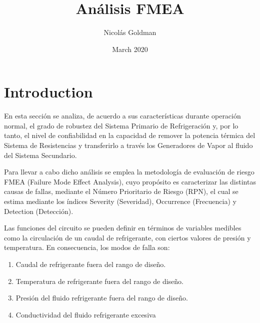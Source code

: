 \documentclass{article}
\title{Análisis FMEA}
\author{Nicolás Goldman}
\date{March 2020}
\begin{document}
\maketitle

\section{Introduction}
En esta sección se analiza, de acuerdo a sus características durante operación normal, el grado de robustez del Sistema Primario de Refrigeración y, por lo tanto, el nivel de   confiabilidad   en   la   capacidad   de  remover   la   potencia   térmica  del   Sistema   de Resistencias  y  transferirlo  a  través  los  Generadores  de  Vapor  al  fluido  del  Sistema Secundario.

Para llevar a cabo dicho análisis se emplea la metodología de evaluación de riesgo FMEA (Failure Mode Effect Analysis), cuyo propósito es caracterizar las distintas causas de fallas,  mediante  el  Número  Prioritario  de  Riesgo  (RPN),  el  cual  se  estima  mediante  los índices Severity (Severidad), Occurrence (Frecuencia) y Detection (Detección).

Las funciones del circuito se pueden definir en términos de variables medibles como la circulación de un caudal de refrigerante, con ciertos valores de presión y temperatura. En consecuencia, los modos de falla son:
\begin{enumerate}
    \item Caudal de refrigerante fuera del rango de diseño.
    \item Temperatura de refrigerante fuera del rango de diseño.
    \item Presión del fluido refrigerante fuera del rango de diseño.
    \item Conductividad del fluido refrigerante excesiva
\end{enumerate}
\end{document}

